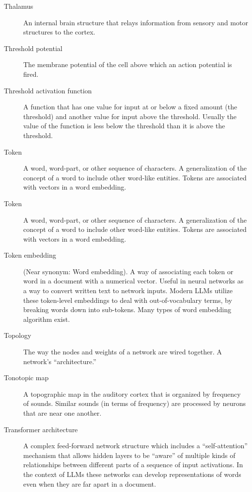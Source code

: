 \begin{description}
\item[Thalamus] An internal brain structure that relays information from sensory and motor structures to the cortex.

\item[Threshold potential] The membrane potential of the cell above which an action potential is fired. 

\item[Threshold activation function] A function that has one value for  input at or below a fixed amount (the threshold) and another value for input above the threshold. Usually the value of the function is less below the  threshold than it is above the threshold.

\item[Token] A word, word-part, or other sequence of characters. A generalization of the concept of a word to include other word-like entities. Tokens are associated with vectors in a word embedding.

\item[Token] A word, word-part, or other sequence of characters. A generalization of the concept of a word to include other word-like entities. Tokens are associated with vectors in a word embedding.

\item[Token embedding] (Near synonym: Word embedding). A way of associating each token or word in a document with a numerical vector. Useful in neural networks as a way to convert written text to network inputs. Modern LLMs utilize these token-level embeddings to deal with out-of-vocabulary terms, by breaking words down into sub-tokens. Many types of word embedding algorithm exist.

\item[Topology] The way the nodes and weights of a network are wired together. A network's ``architecture.''

\item[Tonotopic map] A topographic map in the auditory cortex that is organized by frequency of sounds. Similar sounds (in terms of frequency) are processed by neurons that are near one another.

\item[Transformer architecture] A complex feed-forward network structure which includes a ``self-attention'' mechanism that allows hidden layers to be ``aware'' of multiple kinds of relationships between different parts of a sequence of input activations. In the context of LLMs these networks can develop representations of words even when they are far apart in a document.


\end{description}
